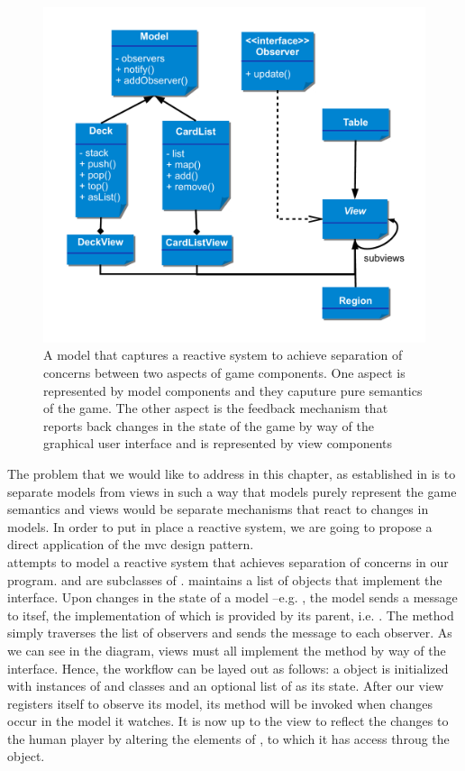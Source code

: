 \documentclass[10pt,oneside,a4paper]{skh-scrreprt}
\begin{document}
\begin{figure}[h]\label{fig:mvc}
\caption[%
Object-oriented Structure of
a Reactive System for Neille
]{%
A model that captures 
a reactive system to achieve 
separation of concerns
between two aspects
of game components. 
One aspect is represented by
model components
and they caputure 
pure semantics of the game.
The other aspect is 
the feedback mechanism 
that reports back
changes in the state of 
the game by way of
the graphical user interface
and is represented by view components}
\includegraphics[width=15.5cm]{fig/class-structure}
\end{figure}

The problem that
we would like to
address in this
chapter, as established
in 
is to separate
models from views in
such a way that models
purely represent the
game semantics
and views would be
separate mechanisms that
react to changes in models.
In order to put in place
a reactive system,
we are going to propose
a direct application of
the \gls{mvc} design pattern.
\\

 attempts
to model a reactive system
that achieves separation
of concerns in our program.
\cardlist{} and \deck{} 
are subclasses of \model{}.
\model{} maintains a
list of objects that
implement the \observer{}
interface.
Upon changes in
the state of a
model --e.g. \deck{},
the model
sends a \notify{}
message to itsef, the
implementation of which
is provided by its
parent, i.e. \model{}.
The \notify{} method
simply traverses the list
of observers and sends
the \update{} message
to each observer.
As we can see in the 
diagram, views must
all implement the
\update{} method by
way of the \observer{}
interface. Hence,
the workflow
can be layed out
as follows:
a \view{} object is 
initialized with instances of
\model{} and \region{} classes
and an optional list of \subviews{}
as its state.
After our view registers
itself to observe its model,
its \update{} method will
be invoked when changes
occur in the model it watches.
It is now up to the view
to reflect the changes to the
human player by altering the
elements of ,
to which it has access throug
the \region{} object.
\end{document}
